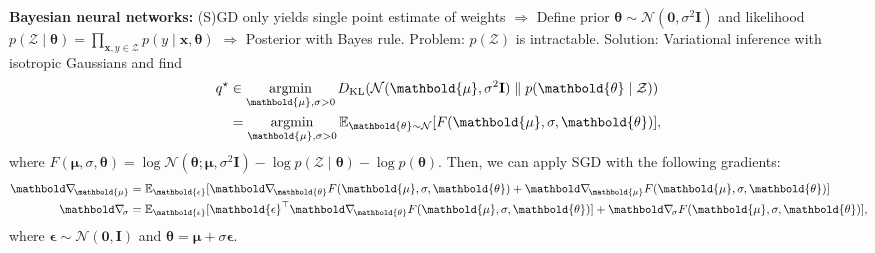 \documentclass[9pt]{extarticle}
\newenvironment{topic}[1]
{\textbf{\sffamily \colorbox{black}{\rlap{\textbf{\textcolor{white}{#1}}}\hspace{\linewidth}\hspace{-2\fboxsep}}}}
{}
\newenvironment{subtopic}[1]
{\textbf{\sffamily #1:}}
{}
\renewcommand{\mat}[1]{\ensuremath{\mathbf{#1}}}
\renewcommand{\vec}[1]{\ensuremath{\mathbold{#1}}}
\begin{document}
\begin{multicols*}{3}
\begin{topic}{Uncertainty quantification}
        \begin{subtopic}{Bayesian neural networks}
            (S)GD only yields single point estimate of weights $\Rightarrow$ Define prior
            $\vec{\theta} \sim \mathcal{N}(\vec{0}, \sigma^2 \mat{I})$ and likelihood $p(\mathcal{Z}
                \mid \vec{\theta}) = \prod_{\vec{x},y \in \mathcal{Z}} p(y \mid \vec{x}, \vec{\theta})$
            $\Rightarrow$ Posterior with Bayes rule. Problem: $p(\mathcal{Z})$ is intractable.
            Solution: Variational inference with isotropic Gaussians and find
            \begin{align*}
                q^\star & \in \argmin_{\vec{\mu}, \sigma > 0} D_{\mathrm{KL}} (\mathcal{N}(\vec{\mu}, \sigma^2 \mat{I}) \;\|\; p(\vec{\theta} \mid \mathcal{Z})) \\
                        & = \argmin_{\vec{\mu}, \sigma > 0} \E_{\vec{\theta} \sim \mathcal{N}} [F(\vec{\mu}, \sigma, \vec{\theta})],
            \end{align*}
            where $F(\vec{\mu}, \sigma, \vec{\theta}) = \log \mathcal{N}(\vec{\theta}; \vec{\mu}, \sigma^2 \mat{I}) - \log p(\mathcal{Z} \mid \vec{\theta}) - \log p(\vec{\theta})$. Then, we can apply SGD with the following gradients:
            \begin{align*}
                \grad{}{\vec{\mu}} & = \E_{\vec{\epsilon}} [\grad{F(\vec{\mu}, \sigma, \vec{\theta})}{\vec{\theta}} + \grad{F(\vec{\mu}, \sigma, \vec{\theta})}{\vec{\mu}}]                           \\
                \grad{}{\sigma}    & = \E_{\vec{\epsilon}} [\transpose{\vec{\epsilon}} \grad{F(\vec{\mu}, \sigma, \vec{\theta})}{\vec{\theta}}] + \grad{F(\vec{\mu}, \sigma, \vec{\theta})}{\sigma}],
            \end{align*}
            where $\vec{\epsilon} \sim \mathcal{N}(\vec{0}, \mat{I})$ and $\vec{\theta} = \vec{\mu} + \sigma \vec{\epsilon}$.

        \end{subtopic}


\end{topic}
\end{multicols*}
\end{document}
